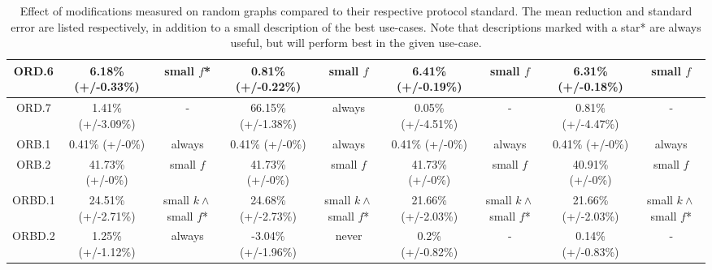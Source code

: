 \begin{table*}
{\begin{tabular}{c|cc|cc|cc|cc|}
\multicolumn{1}{|c|}{ORD.6}       & 6.18\% (+/-0.33\%)            & small $f$*               & 0.81\% (+/-0.22\%)             & small $f$               & 6.41\% (+/-0.19\%)            & small $f$               & 6.31\% (+/-0.18\%)             & small $f$               \\ \hline
\multicolumn{1}{|c|}{ORD.7}       & 1.41\% (+/-3.09\%)            & -               & 66.15\% (+/-1.38\%)             & always               & 0.05\% (+/-4.51\%)            & -               & 0.81\% (+/-4.47\%)             & -               \\ \hline
\multicolumn{1}{|c|}{ORB.1}       & 0.41\% (+/-0\%)            & always               & 0.41\% (+/-0\%)             & always               & 0.41\% (+/-0\%)            & always               & 0.41\% (+/-0\%)             & always               \\ \hline
\multicolumn{1}{|c|}{ORB.2}       & 41.73\% (+/-0\%)            & small $f$               & 41.73\% (+/-0\%)             & small $f$               & 41.73\% (+/-0\%)            & small $f$               & 40.91\% (+/-0\%)             & small $f$               \\ \hline
\multicolumn{1}{|c|}{ORBD.1}      & 24.51\% (+/-2.71\%)            & small $k \wedge$ small $f$*                & 24.68\% (+/-2.73\%)             & small $k \wedge$ small $f$*                 & 21.66\% (+/-2.03\%)            & small $k \wedge$ small $f$*                 & 21.66\% (+/-2.03\%)             & small $k \wedge$ small $f$*                 \\ \hline
\multicolumn{1}{|c|}{ORBD.2}      & 1.25\% (+/-1.12\%)            & always               & -3.04\% (+/-1.96\%)             & never               & 0.2\% (+/-0.82\%)            & -               & 0.14\% (+/-0.83\%)             & -               \\ \hline
\end{tabular}
    }
  \caption{Effect of modifications measured on random graphs compared to their respective protocol standard. The mean reduction and standard error are listed respectively, in addition to a small description of the best use-cases. Note that descriptions marked with a star* are always useful, but will perform best in the given use-case.}
  \label{eval:individual-results}
\end{table*}


